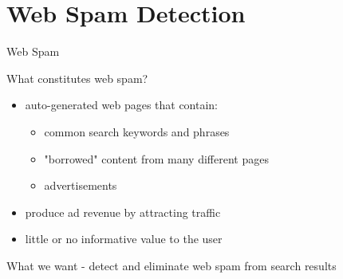 \section{Web Spam Detection}

\begin{frame}{Web Spam}

What constitutes web spam?

\begin{itemize}

\item auto-generated web pages that contain:

\begin{itemize}
	\item common search keywords and phrases
	\item "borrowed" content from many different pages
	\item advertisements
\end{itemize}

\item produce ad revenue by attracting traffic

\item little or no informative value to the user

\end{itemize}

What we want - detect and eliminate web spam from search results
\end{frame}

